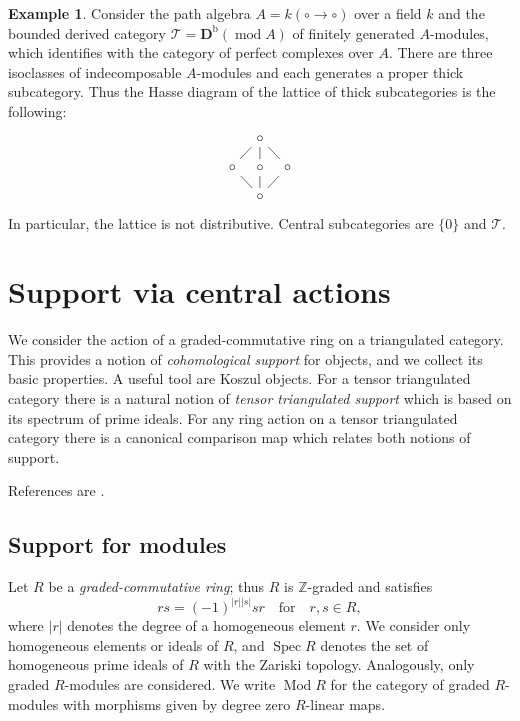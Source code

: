 \documentclass{amsart}[a4]
\theoremstyle{definition}
\newtheorem{example}[theorem]{Example}
\theoremstyle{remark}
\numberwithin{equation}{section}
\renewcommand{\mod}{\operatorname{mod}}
\newcommand{\Mod}{\operatorname{Mod}}
\newcommand{\Spec}{\operatorname{Spec}}
\newcommand{\cat}{\mathcal}
\newcommand{\bbZ}{\mathbb Z}
\begin{document}
\begin{example}\label{ex:distrib}
  Consider the path algebra $A=k(\circ\to\circ)$ over a field $k$ and
  the bounded derived category $\cat T=\mathbf D^{\mathrm b}(\mod A)$
  of finitely generated $A$-modules, which identifies with the
  category of perfect complexes over $A$.  There are three
  isoclasses of indecomposable $A$-modules and each generates a proper thick
  subcategory. Thus the Hasse diagram of the
  lattice of thick subcategories is the following:
\[\begin{tikzcd}[column sep = tiny, row sep = small]
    &\circ\arrow[dash]{d}\arrow[dash]{ld}\arrow[dash]{rd}\\
    \circ \arrow[dash]{rd}&\circ\arrow[dash]{d}&\circ \arrow[dash]{ld}\\
    &\circ
  \end{tikzcd}\]
In particular, the lattice is not distributive. Central subcategories are $\{0\}$ and $\cat T$.
\end{example}


\section{Support via central actions}

We consider the action of a graded-commutative ring on a triangulated
category. This provides a notion of \emph{cohomological support} for
objects, and we collect its basic properties. A useful tool are Koszul
objects. For a tensor triangulated category there is a natural notion of
\emph{tensor triangulated support} which is based on its spectrum of
prime ideals. For any ring action on a tensor triangulated category
there is a canonical comparison map which relates both notions of
support.

References are \cite{Balmer:2005a, Benson/Iyengar/Krause:2008a, Hochster:1969a}.



\subsection*{Support for modules}


Let $R$ be a \emph{graded-commutative ring}; thus $R$ is $\bbZ$-graded
and satisfies \[rs=(-1)^{|r||s|}sr\quad \text{for}\quad r,s\in R,\]
where $|r|$ denotes the degree of a homogeneous element $r$.
We consider only homogeneous elements or ideals
of $R$, and $\Spec R$ denotes the set of homogeneous prime ideals of
$R$ with the Zariski topology. Analogously, only graded $R$-modules
are considered. We write $\Mod R$ for the category of graded
$R$-modules with morphisms given by degree zero $R$-linear maps.
\end{document}
